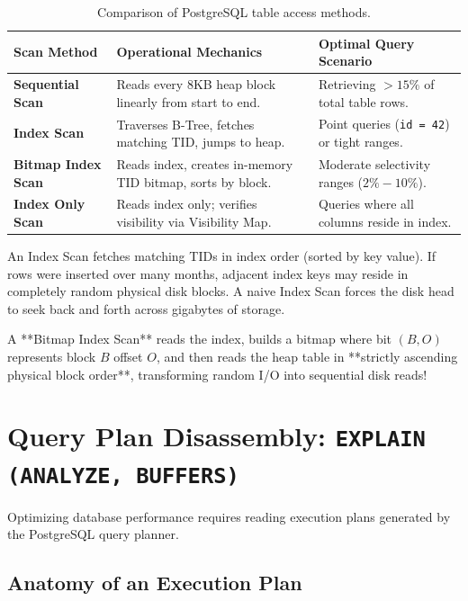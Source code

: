 \begin{table}[htbp]
\centering
\small\sffamily
\begin{tabular}{@{}lll@{}}
\toprule
\textbf{Scan Method} & \textbf{Operational Mechanics} & \textbf{Optimal Query Scenario} \\ \midrule
\textbf{Sequential Scan} & Reads every 8KB heap block linearly from start to end. & Retrieving $> 15\%$ of total table rows. \\
\textbf{Index Scan} & Traverses B-Tree, fetches matching TID, jumps to heap. & Point queries (\texttt{id = 42}) or tight ranges. \\
\textbf{Bitmap Index Scan} & Reads index, creates in-memory TID bitmap, sorts by block. & Moderate selectivity ranges ($2\% - 10\%$). \\
\textbf{Index Only Scan} & Reads index only; verifies visibility via Visibility Map. & Queries where all columns reside in index. \\ \bottomrule
\end{tabular}
\caption{Comparison of PostgreSQL table access methods.}
\label{tab:scans}
\end{table}

\begin{underthehoodbox}
An Index Scan fetches matching TIDs in index order (sorted by key value). If rows were inserted over many months, adjacent index keys may reside in completely random physical disk blocks. A naive Index Scan forces the disk head to seek back and forth across gigabytes of storage. 

A **Bitmap Index Scan** reads the index, builds a bitmap where bit $(B, O)$ represents block $B$ offset $O$, and then reads the heap table in **strictly ascending physical block order**, transforming random I/O into sequential disk reads!
\end{underthehoodbox}

\section{Query Plan Disassembly: \texttt{EXPLAIN (ANALYZE, BUFFERS)}}

Optimizing database performance requires reading execution plans generated by the PostgreSQL query planner.

\subsection{Anatomy of an Execution Plan}

